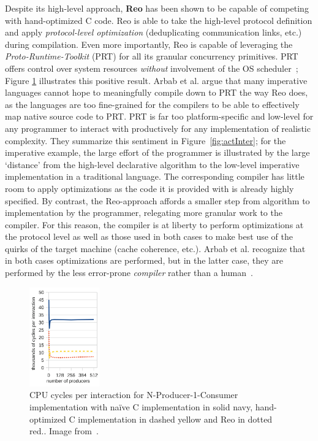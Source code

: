 Despite its high-level approach, \textbf{Reo} has been shown to be capable of competing with hand-optimized C code. Reo is able to take the high-level protocol definition and apply \textit{protocol-level optimization} (deduplicating communication links, etc.) during compilation. Even more importantly, Reo is capable of leveraging the \textit{Proto-Runtime-Toolkit} (PRT) for all its granular concurrency primitives. PRT offers control over system resources \textit{without} involvement of the OS scheduler~\cite{proper}; Figure \ref{fig:reoPerf} illustrates this positive result. Arbab et al. argue that many imperative languages cannot hope to meaningfully compile down to PRT the way Reo does, as the languages are too fine-grained for the compilers to be able to effectively map native source code to PRT. PRT is far too platform-specific and low-level for any programmer to interact with productively for any implementation of realistic complexity. They summarize this sentiment in Figure~\ref{fig:actInter}; for the imperative example, the large effort of the programmer is illustrated by the large `distance' from the high-level declarative algorithm to the low-level imperative implementation in a traditional language. The corresponding compiler has little room to apply optimizations as the code it is provided with is already highly specified. By contrast, the Reo-approach affords a smaller step from algorithm to implementation by the programmer, relegating more granular work to the compiler. For this reason, the compiler is at liberty to perform optimizations at the protocol level as well as those used in both cases to make best use of the quirks of the target machine (cache coherence, etc.). Arbab et al. recognize that in both cases optimizations are performed, but in the latter case, they are performed by the less error-prone \textit{compiler} rather than a human~\cite{proper}.

\begin{figure}
\centering
\includegraphics[page=1, width=0.27\textwidth]{images/reoPerf.png}
\caption[]{CPU cycles per interaction for N-Producer-1-Consumer implementation with na\"{i}ve C implementation in solid navy, hand-optimized C implementation in dashed yellow and Reo in dotted red.. Image from~\cite{proper}.}
\label{fig:reoPerf}
\end{figure}


